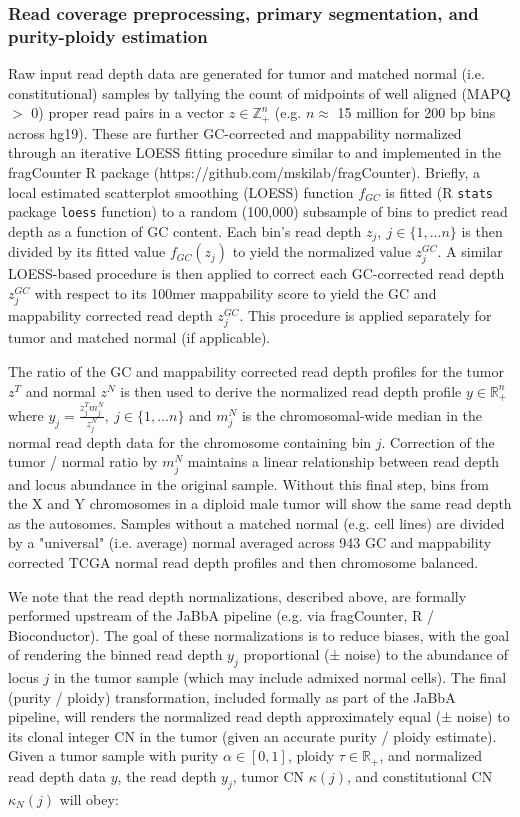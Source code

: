 \documentclass[phd,tocprelim]{cornell}
\newcommand{\ttt}[1]{\texttt{#1}}
\begin{document}
\subsubsection*{Read coverage preprocessing, primary segmentation, and purity-ploidy estimation}
Raw input read depth data are generated for tumor and matched normal (i.e. constitutional) samples by tallying the count of midpoints of well aligned (MAPQ $>$ 0) proper read pairs in a vector $z \in \mathbb{Z}^n_+$ (e.g. $n \approx$ 15 million for 200 bp bins across hg19).  These are further GC-corrected and mappability normalized through an iterative LOESS fitting procedure similar to \cite{Ha:2012kr} and implemented in the fragCounter R package (https://github.com/mskilab/fragCounter). Briefly, a local estimated scatterplot smoothing (LOESS) function $f_{GC}$ is fitted (R \ttt{stats} package \ttt{loess} function) to a random (100,000) subsample of bins to predict read depth as a function of GC content. Each bin's read depth $z_j,~j \in \{1, ... n\}$ is then divided by its fitted value $f_{GC}(z_j)$ to yield the normalized value $z^{GC}_j$.  A similar LOESS-based procedure is then applied to correct each GC-corrected read depth $z^{GC}_j$ with respect to its 100mer mappability score to yield the GC and mappability corrected read depth $z^{GC}_j$.  This procedure is applied separately for tumor and matched normal (if applicable).

The ratio of the GC and mappability corrected read depth profiles for the tumor $z^T$ and normal $z^N$ is then used to derive the normalized read depth profile $y \in \mathbb{R}^n_+$ where $y_j = \frac{z_j^Tm_j^N}{z_j^N},~j \in \{1, ... n\}$ and $m^N_j$ is the chromosomal-wide median in the normal read depth data for the chromosome containing bin $j$.  Correction of the tumor / normal ratio by $m^N_j$ maintains a linear relationship between read depth and locus abundance in the original sample. Without this final step, bins from the X and Y chromosomes in a diploid male tumor will show the same read depth as the autosomes.  Samples without a matched normal (e.g. cell lines) are divided by a "universal" (i.e. average) normal averaged across 943 GC and mappability corrected TCGA normal read depth profiles and then chromosome balanced.


We note that the read depth normalizations, described above, are formally performed upstream of the JaBbA pipeline (e.g. via fragCounter, R / Bioconductor). The goal of these normalizations is to reduce biases, with the goal of rendering the binned read depth $y_j$ proportional (± noise) to the abundance of locus $j$ in the tumor sample (which may include admixed normal cells).  The final (purity / ploidy) transformation, included formally as part of the JaBbA pipeline, will renders the normalized read depth approximately equal (± noise) to its clonal integer CN in the tumor (given an accurate purity / ploidy estimate). Given a tumor sample with purity $\alpha \in [0, 1]$, ploidy $\tau \in \mathbb{R}_+$, and normalized read depth data $y$, the read depth $y_j$, tumor CN $\kappa(j)$, and constitutional CN $\kappa_N(j)$ will obey:
\end{document}
